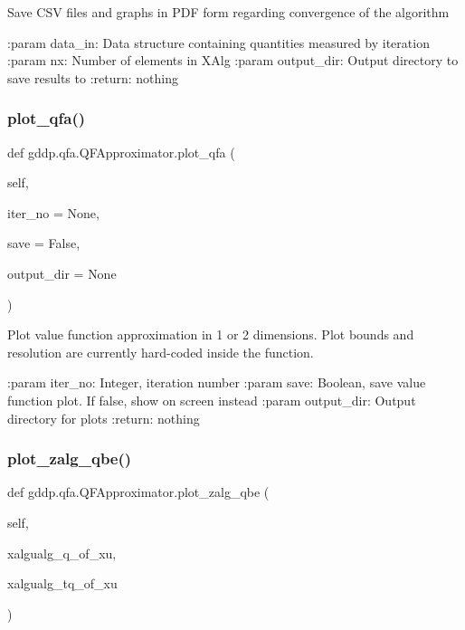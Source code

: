 \begin{DoxyVerb}Save CSV files and graphs in PDF form regarding convergence of the algorithm

:param data_in: Data structure containing quantities measured by iteration
:param nx: Number of elements in XAlg
:param output_dir: Output directory to save results to
:return: nothing
\end{DoxyVerb}
 \mbox{\label{classgddp_1_1qfa_1_1_q_f_approximator_ae727d0246dd3d97387b73e17ca19ee33}} 
\subsubsection{\texorpdfstring{plot\_qfa()}{plot\_qfa()}}
{\footnotesize\ttfamily def gddp.\+qfa.\+Q\+F\+Approximator.\+plot\+\_\+qfa (\begin{DoxyParamCaption}\item[{}]{self,  }\item[{}]{iter\+\_\+no = {\ttfamily None},  }\item[{}]{save = {\ttfamily False},  }\item[{}]{output\+\_\+dir = {\ttfamily None} }\end{DoxyParamCaption})}

\begin{DoxyVerb}Plot value function approximation in 1 or 2 dimensions. Plot bounds and resolution are
currently hard-coded inside the function.

:param iter_no: Integer, iteration number
:param save: Boolean, save value function plot. If false, show on screen instead
:param output_dir: Output directory for plots
:return: nothing
\end{DoxyVerb}
 \mbox{\label{classgddp_1_1qfa_1_1_q_f_approximator_ade147379e2e5a350b9545a07ac15d533}} 
\subsubsection{\texorpdfstring{plot\_zalg\_qbe()}{plot\_zalg\_qbe()}}
{\footnotesize\ttfamily def gddp.\+qfa.\+Q\+F\+Approximator.\+plot\+\_\+zalg\+\_\+qbe (\begin{DoxyParamCaption}\item[{}]{self,  }\item[{}]{xalgualg\+\_\+q\+\_\+of\+\_\+xu,  }\item[{}]{xalgualg\+\_\+tq\+\_\+of\+\_\+xu }\end{DoxyParamCaption})}


